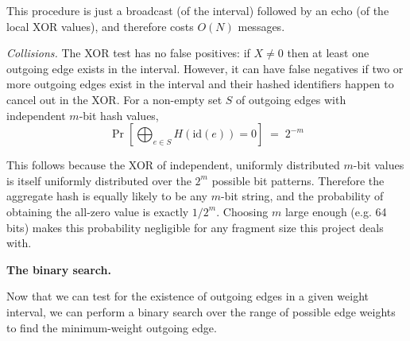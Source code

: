 This procedure is just a broadcast (of the interval) followed by an echo (of the local XOR
values), and therefore costs $O(N)$ messages.

\smallskip
\noindent\emph{Collisions.} The XOR test has no false positives: if $X \neq 0$ then at
least one outgoing edge exists in the interval. However, it can have false negatives if 
two or more outgoing edges exist in the interval and their hashed identifiers happen to cancel
out in the XOR.
For a non-empty set $S$ of outgoing edges with independent $m$-bit hash values,
\[
  \Pr\!\left[\bigoplus_{e \in S} H(\mathrm{id}(e)) = 0\right]
  \;=\; 2^{-m}
\]

This follows because the XOR of independent, uniformly distributed $m$-bit
values is itself uniformly distributed over the $2^m$ possible bit patterns.
Therefore the aggregate hash is equally likely to be any $m$-bit string, and
the probability of obtaining the all-zero value is exactly $1/2^m$. Choosing $m$
large enough (e.g. 64 bits) makes this probability negligible for any fragment size
this project deals with.

\medskip

\noindent\textbf{The binary search.}

Now that we can test for the existence of outgoing edges in a given weight interval, we
can perform a binary search over the range of possible edge weights to find the
minimum-weight outgoing edge.

